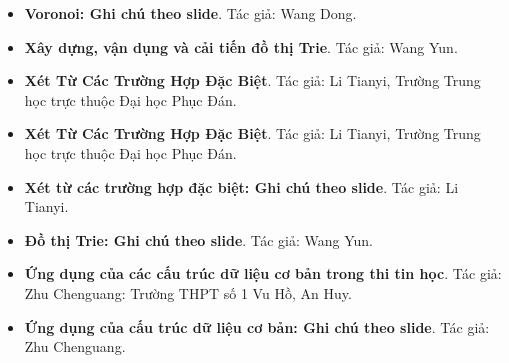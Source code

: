 \documentclass[11pt]{article}
\begin{document}
\begin{itemize}[leftmargin=2em]
  \item \textbf{Voronoi: Ghi chú theo slide}. Tác giả: Wang Dong.
  \item \textbf{Xây dựng, vận dụng và cải tiến đồ thị Trie}. Tác giả: Wang Yun.
  \item \textbf{Xét Từ Các Trường Hợp Đặc Biệt}. Tác giả: Li Tianyi, Trường Trung học trực thuộc Đại học Phục Đán.
  \item \textbf{Xét Từ Các Trường Hợp Đặc Biệt}. Tác giả: Li Tianyi, Trường Trung học trực thuộc Đại học Phục Đán.
  \item \textbf{Xét từ các trường hợp đặc biệt: Ghi chú theo slide}. Tác giả: Li Tianyi.
  \item \textbf{Đồ thị Trie: Ghi chú theo slide}. Tác giả: Wang Yun.
  \item \textbf{Ứng dụng của các cấu trúc dữ liệu cơ bản trong thi tin học}. Tác giả: Zhu Chenguang: Trường THPT số 1 Vu Hồ, An Huy.
  \item \textbf{Ứng dụng của cấu trúc dữ liệu cơ bản: Ghi chú theo slide}. Tác giả: Zhu Chenguang.
\end{itemize}
\end{document}
